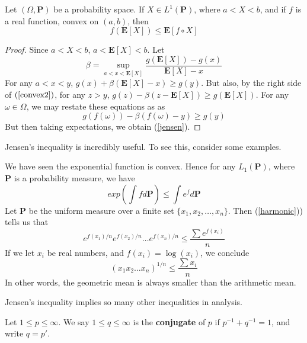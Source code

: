 \begin{theorem}
    Let $(\Omega, \mathbf{P})$ be a probability space. If $X \in L^1(\mathbf{P})$, where $a < X< b$, and if $f$ is a real function, convex on $(a,b)$, then
    \begin{equation} \label{jensen} f(\mathbf{E}[X]) \leq \mathbf{E}[f \circ X] \end{equation}
\end{theorem}
\begin{proof}
    Since $a < X < b$, $a < \mathbf{E}[X] < b$. Let
    \[ \beta = \sup_{a < x < \mathbf{E}[X]} \frac{g(\mathbf{E}[X]) - g(x)}{\mathbf{E}[X] - x} \]
    For any $a < x < y$, $g(x) + \beta(\mathbf{E}[X] - x) \geq g(y)$. But also, by the right side of $(\ref{convex2})$, for any $z > y$, $g(z) - \beta(z - \mathbf{E}[X]) \geq g(\mathbf{E}[X])$. For any $\omega \in \Omega$, we may restate these equations as as
    \[ g(f(\omega)) - \beta(f(\omega) - y) \geq g(y) \]
    But then taking expectations, we obtain (\ref{jensen}).
\end{proof}

Jensen's inequality is incredibly useful. To see this, consider some examples.

\begin{example}
    We have seen the exponential function is convex. Hence for any $L_1(\mathbf{P})$, where $\mathbf{P}$ is a probability measure, we have
    \begin{equation} \label{harmonic} exp\left(\int f d\mathbf{P} \right) \leq \int e^f d\mathbf{P} \end{equation}
    Let $\mathbf{P}$ be the uniform measure over a finite set $\{ x_1, x_2, \dots, x_n \}$. Then (\ref{harmonic})) tells us that
    \[ e^{f(x_1)/n}e^{f(x_2)/n} \dots e^{f(x_n)/n} \leq \frac{\sum e^{f(x_i)}}{n} \]
    If we let $x_i$ be real numbers, and $f(x_i) = \log(x_i)$, we conclude
    \[ (x_1x_2 \dots x_n)^{1/n} \leq \frac{\sum x_i}{n} \]
    In other words, the geometric mean is always smaller than the arithmetic mean.
\end{example}

Jensen's inequality implies so many other inequalities in analysis.

\begin{definition}
    Let $1 \leq p \leq \infty$. We say $1 \leq q \leq \infty$ is the {\bf conjugate} of $p$ if $p^{-1} + q^{-1} = 1$, and write $q = p'$.
\end{definition}

